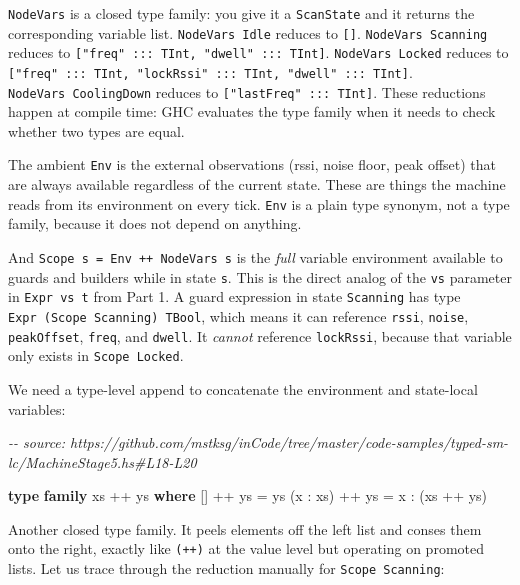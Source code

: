 \documentclass[]{article}
\newenvironment{Shaded}{}{}
\newcommand{\CommentTok}[1]{\textcolor[rgb]{0.38,0.63,0.69}{\textit{#1}}}
\newcommand{\KeywordTok}[1]{\textcolor[rgb]{0.00,0.44,0.13}{\textbf{#1}}}
\newcommand{\NormalTok}[1]{#1}
\newcommand{\OperatorTok}[1]{\textcolor[rgb]{0.40,0.40,0.40}{#1}}
\newcommand{\OtherTok}[1]{\textcolor[rgb]{0.00,0.44,0.13}{#1}}
\begin{document}
\texttt{NodeVars} is a closed type family: you give it a \texttt{ScanState} and
it returns the corresponding variable list. \texttt{NodeVars\ Idle} reduces to
\texttt{{[}{]}}. \texttt{NodeVars\ Scanning} reduces to
\texttt{{[}"freq"\ :::\ TInt,\ "dwell"\ :::\ TInt{]}}. \texttt{NodeVars\ Locked}
reduces to
\texttt{{[}"freq"\ :::\ TInt,\ "lockRssi"\ :::\ TInt,\ "dwell"\ :::\ TInt{]}}.
\texttt{NodeVars\ CoolingDown} reduces to \texttt{{[}"lastFreq"\ :::\ TInt{]}}.
These reductions happen at compile time: GHC evaluates the type family when it
needs to check whether two types are equal.

The ambient \texttt{Env} is the external observations (rssi, noise floor, peak
offset) that are always available regardless of the current state. These are
things the machine reads from its environment on every tick. \texttt{Env} is a
plain type synonym, not a type family, because it does not depend on anything.

And \texttt{Scope\ s\ =\ Env\ ++\ NodeVars\ s} is the \emph{full} variable
environment available to guards and builders while in state \texttt{s}. This is
the direct analog of the \texttt{vs} parameter in \texttt{Expr\ vs\ t} from Part
1. A guard expression in state \texttt{Scanning} has type
\texttt{Expr\ (Scope\ Scanning)\ TBool}, which means it can reference
\texttt{rssi}, \texttt{noise}, \texttt{peakOffset}, \texttt{freq}, and
\texttt{dwell}. It \emph{cannot} reference \texttt{lockRssi}, because that
variable only exists in \texttt{Scope\ Locked}.

We need a type-level append to concatenate the environment and state-local
variables:

\begin{Shaded}
\begin{Highlighting}[]
\CommentTok{{-}{-} source: https://github.com/mstksg/inCode/tree/master/code{-}samples/typed{-}sm{-}lc/MachineStage5.hs\#L18{-}L20}

\KeywordTok{type} \KeywordTok{family}\NormalTok{ xs }\OperatorTok{++}\NormalTok{ ys }\KeywordTok{where}
\NormalTok{  \textquotesingle{}[] }\OperatorTok{++}\NormalTok{ ys }\OtherTok{=}\NormalTok{ ys}
\NormalTok{  (x \textquotesingle{}}\OperatorTok{:}\NormalTok{ xs) }\OperatorTok{++}\NormalTok{ ys }\OtherTok{=}\NormalTok{ x \textquotesingle{}}\OperatorTok{:}\NormalTok{ (xs }\OperatorTok{++}\NormalTok{ ys)}
\end{Highlighting}
\end{Shaded}

Another closed type family. It peels elements off the left list and conses them
onto the right, exactly like \texttt{(++)} at the value level but operating on
promoted lists. Let us trace through the reduction manually for
\texttt{Scope\ Scanning}:
\end{document}
